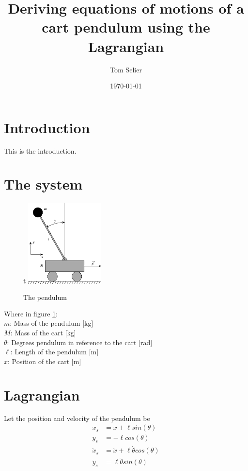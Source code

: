 \documentclass[10pt]{article}
\author{Tom Selier}
\title{Deriving equations of motions of a cart pendulum using the Lagrangian}
\date{\today}
\begin{document}
    \maketitle

    \section{Introduction}
    This is the introduction.

    \section{The system}
    \begin{figure}{t}
        \centering
        \includegraphics[width=4cm]{Cart-pendulum.png}
        \caption{The pendulum}
        \label{fig:system}
    \end{figure}
    
    Where in figure \ref{fig:system}: \\
    \qquad $m$: Mass of the pendulum  [kg] \\
    \qquad $M$: Mass of the cart  [kg] \\
    $\theta$: Degrees pendulum in reference to the cart [rad] \\
    $\ell$: Length of the pendulum [m] \\
    $x$: Position of the cart [m]

    \section{Lagrangian}
    Let the position and velocity of the pendulum be
    \begin{align*}
        x_s &= x + \ell  sin(\theta) \\
        y_s &= - \ell  cos(\theta) \\
        \dot x_s &= \dot x + \ell  \dot \theta  cos(\theta) \\
        \dot y_s &= \ell  \dot \theta  sin(\theta)
    \end{align*}
\end{document}

